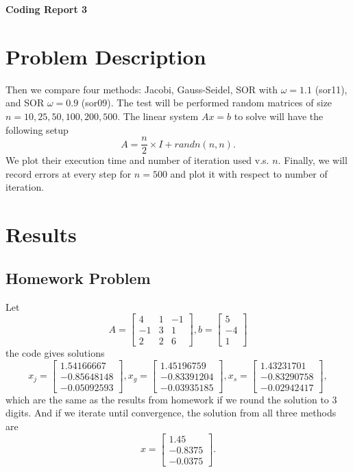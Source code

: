 \documentclass[a4paper,12pt]{article}
\begin{document}
\begin{center} %
	{\Large \bf Coding Report 3} %
	\vspace{2mm}
\end{center}  


\section{Problem Description}

Then we compare four methods: Jacobi, Gauss-Seidel, SOR with $\omega = 1.1$ (sor11), and SOR $\omega = 0.9$ (sor09).
The test will be performed random matrices of size $n = 10, 25, 50, 100, 200, 500$.
The linear system $Ax = b$ to solve will have the following setup
$$
A = \frac{n}{2} \times I + randn(n, n).
$$
We plot their execution time and number of iteration used v.s. $n$.
Finally, we will record errors at every step for $n = 500$ 
and plot it with respect to number of iteration.

\section{Results}

\subsection{Homework Problem}
Let 
$$
A = \begin{bmatrix}
	4 & 1 & -1 \\
	-1 & 3 & 1 \\
	2 & 2 & 6
\end{bmatrix},
b = \begin{bmatrix}
	5 \\ -4 \\ 1
\end{bmatrix}
$$
the code gives solutions
$$
x_j = \begin{bmatrix}
	 1.54166667 \\
	-0.85648148 \\
	-0.05092593 
\end{bmatrix},
x_g = \begin{bmatrix}
	 1.45196759 \\
	-0.83391204 \\
	-0.03935185 
\end{bmatrix},
x_s = \begin{bmatrix}
	 1.43231701 \\
	-0.83290758 \\
	-0.02942417 
\end{bmatrix},
$$
which are the same as the results from homework if we round the solution to 3 digits.
And if we iterate until convergence, the solution from all three methods are
$$
x = \begin{bmatrix}
	 1.45   \\
	-0.8375 \\
	-0.0375
\end{bmatrix}.
$$
\end{document}
